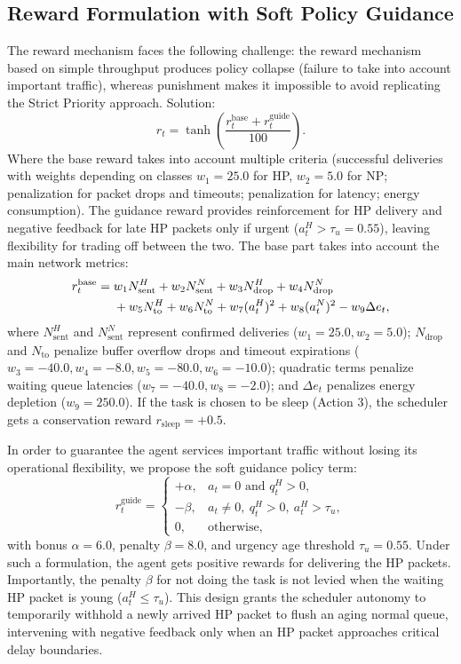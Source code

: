 \documentclass[runningheads]{llncs}
\begin{document}
\subsection{Reward Formulation with Soft Policy Guidance}
The reward mechanism faces the following challenge: the reward mechanism based on simple throughput produces policy collapse (failure to take into account important traffic), whereas punishment makes it impossible to avoid replicating the Strict Priority approach. Solution:
\begin{equation}
 r_t=\tanh\left(\frac{r_t^{\mathrm{base}}+r_t^{\mathrm{guide}}}{100}\right).
 \label{eq:reward}
\end{equation}
Where the base reward takes into account multiple criteria (successful deliveries with weights depending on classes $w_1=25.0$ for HP, $w_2=5.0$ for NP; penalization for packet drops and timeouts; penalization for latency; energy consumption). The guidance reward provides reinforcement for HP delivery and negative feedback for late HP packets only if urgent ($a_t^H>\tau_u=0.55$), leaving flexibility for trading off between the two. The base part takes into account the main network metrics:
\begin{align}
 r_t^{\mathrm{base}}={}&w_1N_{\mathrm{sent}}^H+w_2N_{\mathrm{sent}}^N+w_3N_{\mathrm{drop}}^H+w_4N_{\mathrm{drop}}^N \notag\\
 &+w_5N_{\mathrm{to}}^H+w_6N_{\mathrm{to}}^N+w_7(a_t^H)^2+w_8(a_t^N)^2-w_9\Delta e_t,
 \label{eq:base-reward}
\end{align}
where $N_{\mathrm{sent}}^H$ and $N_{\mathrm{sent}}^N$ represent confirmed deliveries ($w_1=25.0,w_2=5.0$); $N_{\mathrm{drop}}$ and $N_{\mathrm{to}}$ penalize buffer overflow drops and timeout expirations ($w_3=-40.0,w_4=-8.0,w_5=-80.0,w_6=-10.0$); quadratic terms penalize waiting queue latencies ($w_7=-40.0,w_8=-2.0$); and $\Delta e_t$ penalizes energy depletion ($w_9=250.0$). If the task is chosen to be sleep (Action 3), the scheduler gets a conservation reward $r_{\mathrm{sleep}}=+0.5$.

In order to guarantee the agent services important traffic without losing its operational flexibility, we propose the soft guidance policy term:
\begin{equation}
 r_t^{\mathrm{guide}}=
 \begin{cases}
 +\alpha, & a_t=0 \text{ and } q_t^H>0,\\
 -\beta, & a_t\neq0,\ q_t^H>0,\ a_t^H>\tau_u,\\
 0, & \text{otherwise},
 \end{cases}
 \label{eq:guidance}
\end{equation}
with bonus $\alpha=6.0$, penalty $\beta=8.0$, and urgency age threshold $\tau_u=0.55$. Under such a formulation, the agent gets positive rewards for delivering the HP packets. Importantly, the penalty $\beta$ for not doing the task is not levied when the waiting HP packet is young ($a_t^H\leq\tau_u$). This design grants the scheduler autonomy to temporarily withhold a newly arrived HP packet to flush an aging normal queue, intervening with negative feedback only when an HP packet approaches critical delay boundaries.
\end{document}
